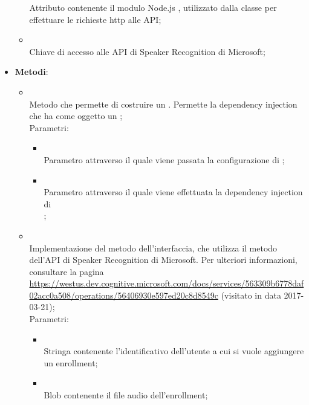\begin{itemize}
\begin{itemize}
		Attributo contenente il modulo Node.js , utilizzato dalla classe per effettuare le richieste http alle API;
		\item[]  \\
		Chiave di accesso alle API di Speaker Recognition di Microsoft;
	\end{itemize}
	\item \textbf{Metodi}:
	\begin{itemize}
		\item[]  \\		Metodo che permette di costruire un . Permette la dependency injection che ha come oggetto un ;\\
		Parametri:
		\begin{itemize}
			\item {} \\
			Parametro attraverso il quale viene passata la configurazione di ;
			\item {} \\
			Parametro attraverso il quale viene effettuata la dependency injection di \\ ;
		\end{itemize}
		\item[]  \\		Implementazione del metodo dell'interfaccia, che utilizza il metodo  dell'API di Speaker Recognition di Microsoft. Per ulteriori informazioni, consultare la pagina \url{https://westus.dev.cognitive.microsoft.com/docs/services/563309b6778daf02acc0a508/operations/56406930e597ed20c8d8549c} (visitato in data 2017-03-21);\\
		Parametri:
		\begin{itemize}
			\item {} \\
			Stringa contenente l'identificativo dell'utente a cui si vuole aggiungere un enrollment;
			\item {} \\
			Blob contenente il file audio dell'enrollment;
		\end{itemize}

\end{itemize}
\end{itemize}
